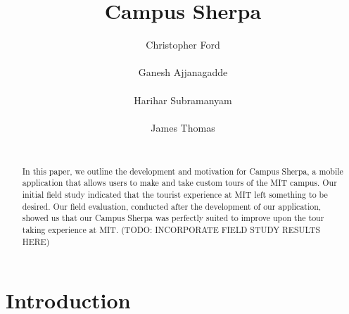 \documentclass{sigchi}
\begin{document}
\title{Campus Sherpa}

\author{
  \alignauthor Christopher Ford\\
    \\
  \alignauthor Ganesh Ajjanagadde\\
    \\
  \alignauthor Harihar Subramanyam\\
    \\
   \alignauthor James Thomas\\
    \\
}

\maketitle

\begin{abstract}
In this paper, we outline the development and motivation for Campus Sherpa, a mobile application that allows users to make and take custom tours of the MIT campus. Our initial field study indicated that the tourist experience at MIT left something to be desired. Our field evaluation, conducted after the development of our application, showed us that our Campus Sherpa was perfectly suited to improve upon the tour taking experience at MIT. (TODO: INCORPORATE FIELD STUDY RESULTS HERE)

\end{abstract}


%
%

\section{Introduction}
\end{document}
